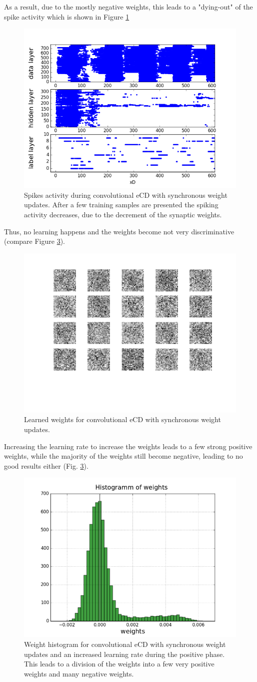 As a result, due to the mostly negative weights, this leads to a "dying-out" of the spike activity which is shown in Figure \ref{fig:ecdnestdieout} 

\begin{figure}[h!]
 	\centering
  	\includegraphics[width=.4\linewidth]{imgs/app/nest/spikes_conv.png}
  	\caption[Spikes activity during convolutional eCD with synchronous weight updates.]{Spikes activity during convolutional eCD with synchronous weight updates. After a few training samples are presented the spiking activity decreases, due to the decrement of the synaptic weights.}
  	\label{fig:ecdnestdieout}
\end{figure}

Thus, no learning happens and the weights become not very discriminative (compare Figure \ref{fig:ecdnestwnot}).


\begin{figure}[h!]
 	\centering
  	\includegraphics[width=.4\linewidth]{imgs/app/nest/w_not.png}
  	\caption{Learned weights for convolutional eCD with synchronous weight updates.}
  	\label{fig:ecdnestwnot}
\end{figure}

Increasing the learning rate to increase the weights leads to a few strong positive weights, while the majority of the weights still become negative, leading to no good results either (Fig. \ref{fig:ecdnestwnot}).


\begin{figure}[h!]
 	\centering
  	\includegraphics[width=.4\linewidth]{imgs/app/nest/w_hist_conv_lr.png}
  	\caption[Weight histogram for convolutional eCD with synchronous weight updates and an increased learning rate during the positive phase.]{Weight histogram for convolutional eCD with synchronous weight updates and an increased learning rate during the positive phase. This leads to a division of the weights into a few very positive weights and many negative weights. }
  	\label{fig:ecdnestwnot}
\end{figure}

